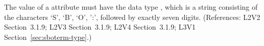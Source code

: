 The value of a  attribute must have the data type
, which is a string consisting of the characters `S', `B',
`O', ':', followed by exactly seven digits.  (References: L2V2 
Section~3.1.9; L2V3 Section~3.1.9; L2V4 Section~3.1.9; L3V1 Section~\ref{sec:sboterm-type}.)
